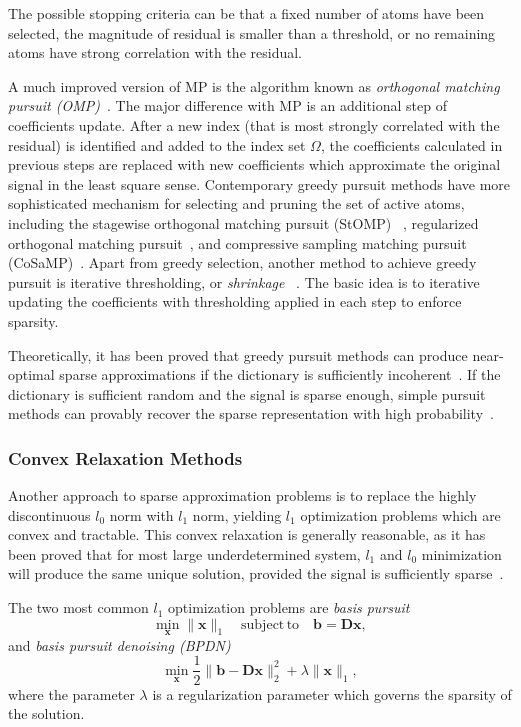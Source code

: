 The possible stopping criteria can be that a fixed number of atoms have been selected, the magnitude of residual is
smaller than a threshold, or no remaining atoms have strong correlation with the residual.

A much improved version of MP is the algorithm known as \emph{orthogonal matching pursuit (OMP)}~\cite{Pati1993}.
The major difference with MP is an additional step of coefficients update. After a new index (that is most strongly
correlated with the residual) is identified and added to the index set $\Omega$,
the coefficients calculated in previous steps are replaced with new coefficients which approximate the original signal
in the least square sense. Contemporary greedy pursuit methods have more sophisticated mechanism for selecting and
pruning the set of active atoms, including the stagewise orthogonal matching pursuit (StOMP)
~\cite{Donoho2012}, regularized orthogonal matching pursuit~\cite{Tropp2007}, and compressive sampling matching
pursuit (CoSaMP)~\cite{Needell2009}. Apart from greedy selection, another method to achieve greedy pursuit is
iterative thresholding, or \emph{shrinkage} ~\cite{Daubechies2004, Blumensath2009}. The basic idea is to
iterative updating the coefficients with thresholding applied in each step to enforce sparsity.

Theoretically, it has been proved that greedy pursuit methods can produce near-optimal sparse approximations
if the dictionary is sufficiently incoherent~\cite{Tropp2004}. If the dictionary is sufficient random and the
signal is sparse enough, simple pursuit methods can provably recover the sparse representation with high probability~\cite{Tropp2007}.


\subsubsection*{Convex Relaxation Methods}
Another approach to sparse approximation problems is to replace the highly discontinuous $l_0$ norm
with $l_1$ norm, yielding $l_1$ optimization problems which are convex and tractable.
This convex relaxation is generally reasonable, as it has been proved that for most large underdetermined system,
$l_1$ and $l_0$ minimization will produce the same unique solution, provided the signal is sufficiently
sparse~\cite{donoho2006most}.

The two most common $l_1$ optimization problems are \emph{basis pursuit}
\begin{equation}
\label{eq:basis-pursuit}
\min_\mathbf{x} \|\mathbf{x}\|_1 \quad \mathrm{subject\,to} \quad \mathbf{b}=\mathbf{D}\mathbf{x},
\end{equation}
and \emph{basis pursuit denoising (BPDN)}
\begin{equation}
\label{eq:bpdn}
\min_\mathbf{x} \frac{1}{2}\|\mathbf{b}-\mathbf{D}\mathbf{x}\|_2^2 + \lambda \|\mathbf{x}\|_1,
\end{equation}
where the parameter $\lambda$ is a regularization parameter which governs the sparsity of the solution.

